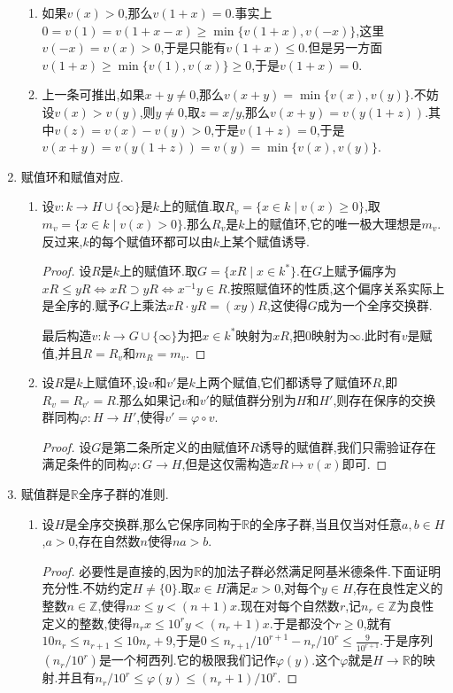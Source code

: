 \begin{enumerate}
\begin{enumerate}[(1)]
		\item 如果$v(x)>0$,那么$v(1+x)=0$.事实上$0=v(1)=v(1+x-x)\ge\min\{v(1+x),v(-x)\}$,这里$v(-x)=v(x)>0$,于是只能有$v(1+x)\le0$.但是另一方面$v(1+x)\ge\min\{v(1),v(x)\}\ge0$,于是$v(1+x)=0$.
		\item 上一条可推出,如果$x+y\not=0$,那么$v(x+y)=\min\{v(x),v(y)\}$.不妨设$v(x)>v(y)$,则$y\not=0$,取$z=x/y$,那么$v(x+y)=v(y(1+z))$.其中$v(z)=v(x)-v(y)>0$,于是$v(1+z)=0$,于是$v(x+y)=v(y(1+z))=v(y)=\min\{v(x),v(y)\}$.
	\end{enumerate}
	\item 赋值环和赋值对应.
	\begin{enumerate}[(1)]
		\item 设$v:k\to H\cup\{\infty\}$是$k$上的赋值.取$R_v=\{x\in k\mid v(x)\ge0\}$,取$m_v=\{x\in k\mid v(x)>0\}$.那么$R_v$是$k$上的赋值环,它的唯一极大理想是$m_v$.反过来,$k$的每个赋值环都可以由$k$上某个赋值诱导.
		\begin{proof}
			
			设$R$是$k$上的赋值环.取$G=\{xR\mid x\in k^*\}$.在$G$上赋予偏序为$xR\le yR\Leftrightarrow xR\supset yR\Leftrightarrow x^{-1}y\in R$.按照赋值环的性质,这个偏序关系实际上是全序的.赋予$G$上乘法$xR\cdot yR=(xy)R$,这使得$G$成为一个全序交换群.
			
			最后构造$v:k\to G\cup\{\infty\}$为把$x\in k^*$映射为$xR$,把$0$映射为$\infty$.此时有$v$是赋值,并且$R=R_v$和$m_R=m_v$.
		\end{proof}
	    \item 设$R$是$k$上赋值环,设$v$和$v'$是$k$上两个赋值,它们都诱导了赋值环$R$,即$R_v=R_{v'}=R$.那么如果记$v$和$v'$的赋值群分别为$H$和$H'$,则存在保序的交换群同构$\varphi:H\to H'$,使得$v'=\varphi\circ v$.
	    \begin{proof}
	    	
	    	设$G$是第二条所定义的由赋值环$R$诱导的赋值群,我们只需验证存在满足条件的同构$\varphi:G\to H$,但是这仅需构造$xR\mapsto v(x)$即可.
	    \end{proof}
	\end{enumerate}
	\item 赋值群是$\mathbb{R}$全序子群的准则.
	\begin{enumerate}[(1)]
		\item 设$H$是全序交换群,那么它保序同构于$\mathbb{R}$的全序子群,当且仅当对任意$a,b\in H$,$a>0$,存在自然数$n$使得$na>b$.
		\begin{proof}
			
			必要性是直接的,因为$\mathbb{R}$的加法子群必然满足阿基米德条件.下面证明充分性.不妨约定$H\not=\{0\}$.取$x\in H$满足$x>0$,对每个$y\in H$,存在良性定义的整数$n\in\mathbb{Z}$,使得$nx\le y<(n+1)x$.现在对每个自然数$r$,记$n_r\in\mathbb{Z}$为良性定义的整数,使得$n_rx\le 10^ry<(n_r+1)x$.于是都没个$r\ge0$,就有$10n_r\le n_{r+1}\le 10n_r+9$,于是$0\le n_{r+1}/10^{r+1}-n_r/10^r\le\frac{9}{10^{r+1}}$.于是序列$(n_r/10^r)$是一个柯西列.它的极限我们记作$\varphi(y)$.这个$\varphi$就是$H\to\mathbb{R}$的映射.并且有$n_r/10^r\le\varphi(y)\le(n_r+1)/10^r$.
			

\end{proof}
\end{enumerate}
\end{enumerate}
